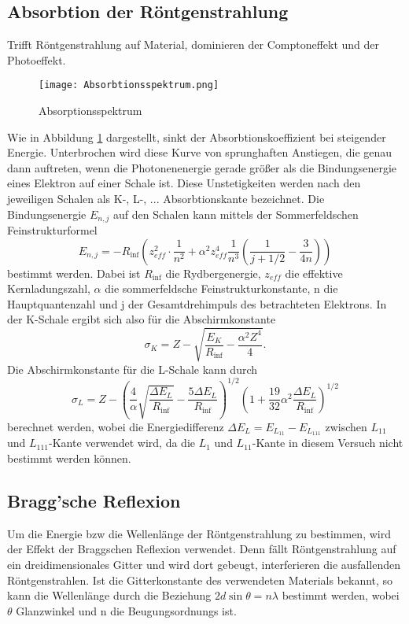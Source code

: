 \subsection{Absorbtion der Röntgenstrahlung}
    Trifft Röntgenstrahlung auf Material, dominieren der Comptoneffekt und der Photoeffekt.
    \begin{figure}
        \centering
        \texttt{[image: Absorbtionsspektrum.png]}
        \caption{Absorptionsspektrum}
        \label{fig:rechtschreifehler}
      \end{figure}
    Wie in Abbildung \ref{fig:rechtschreifehler} dargestellt, sinkt der Absorbtionskoeffizient bei steigender Energie.
    Unterbrochen wird diese Kurve von sprunghaften Anstiegen, die genau dann auftreten, wenn 
    die Photonenenergie gerade größer als die Bindungsenergie eines Elektron auf einer Schale ist.
    Diese Unstetigkeiten werden nach den jeweiligen Schalen als K-, L-, ... Absorbtionskante
    bezeichnet. Die Bindungsenergie $E_{n,j}$ auf den Schalen kann mittels der 
    Sommerfeldschen Feinstrukturformel
    \begin{equation}
        E_{n, j}=-R_{\inf}(z_{eff}^2 \cdot \dfrac{1}{n^2} + \alpha^2z_{eff}^4 \dfrac{1}{n^3}
        (\dfrac{1}{j+1/2}-\dfrac{3}{4n}))
    \end{equation}
    bestimmt werden. Dabei ist $R_{\inf}$ die Rydbergenergie, $z_{eff}$ die effektive
    Kernladungszahl, $\alpha$ die sommerfeldsche Feinstrukturkonstante, n die Hauptquantenzahl
    und j der Gesamtdrehimpuls des betrachteten Elektrons. In der K-Schale ergibt sich also
    für die Abschirmkonstante 
    \begin{equation}
        \sigma_K = Z - \sqrt{\dfrac{E_K}{R_{\inf}}-\dfrac{\alpha^2 Z^4}{4}}.
    \end{equation}
    Die Abschirmkonstante für die L-Schale kann durch 
    \begin{equation}
        \sigma_L=Z-(\dfrac{4}{\alpha} \sqrt{\dfrac{\Delta E_L}{R_{\inf}}}-\dfrac{5 \Delta E_L}
        {R_{\inf}})^{1/2} (1+\dfrac{19}{32}\alpha^2 \dfrac{\Delta E_L}{R_{\inf}})^{1/2}
    \end{equation}
    berechnet werden, wobei die Energiedifferenz $\Delta E_L = E_{L_{11}} - E_{L_{111}}$ zwischen 
    $L_{11}$ und $L_{111}$-Kante verwendet wird, da die $L_1$ und $L_{11}$-Kante in diesem
    Versuch nicht bestimmt werden können.

\subsection{Bragg'sche Reflexion}
    Um die Energie bzw die Wellenlänge der Röntgenstrahlung zu bestimmen, wird der Effekt der Braggschen 
    Reflexion verwendet. Denn fällt Röntgenstrahlung auf ein dreidimensionales Gitter
    und wird dort gebeugt, interferieren die ausfallenden Röntgenstrahlen. Ist die 
    Gitterkonstante des verwendeten Materials bekannt, so kann die Wellenlänge durch
    die Beziehung $2 d \sin{\theta}=n \lambda$ bestimmt werden, wobei $\theta$ Glanzwinkel
    und n die Beugungsordnungs ist.